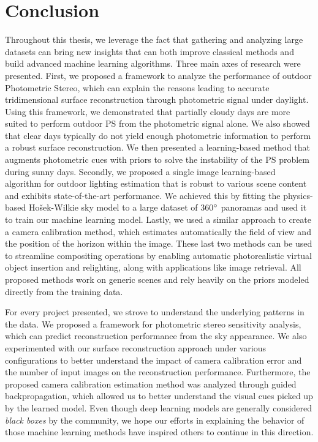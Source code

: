 \chapter*{Conclusion}         %


Throughout this thesis, we leverage the fact that gathering and analyzing large datasets can bring new insights that can both improve classical methods and build advanced machine learning algorithms. Three main axes of research were presented. First, we proposed a framework to analyze the performance of outdoor Photometric Stereo, which can explain the reasons leading to accurate tridimensional surface reconstruction through photometric signal under daylight. Using this framework, we demonstrated that partially cloudy days are more suited to perform outdoor PS from the photometric signal alone. We also showed that clear days typically do not yield enough photometric information to perform a robust surface reconstruction. We then presented a learning-based method that augments photometric cues with priors to solve the instability of the PS problem during sunny days. Secondly, we proposed a single image learning-based algorithm for outdoor lighting estimation that is robust to various scene content and exhibits state-of-the-art performance. We achieved this by fitting the physics-based Ho\v{s}ek-Wilkie sky model to a large dataset of 360$^{\circ}$ panoramas and used it to train our machine learning model. Lastly, we used a similar approach to create a camera calibration method, which estimates automatically the field of view and the position of the horizon within the image. These last two methods can be used to streamline compositing operations by enabling automatic photorealistic virtual object insertion and relighting, along with applications like image retrieval. All proposed methods work on generic scenes and rely heavily on the priors modeled directly from the training data. 

For every project presented, we strove to understand the underlying patterns in the data. We proposed a framework for photometric stereo sensitivity analysis, which can predict reconstruction performance from the sky appearance. We also experimented with our surface reconstruction approach under various configurations to better understand the impact of camera calibration error and the number of input images on the reconstruction performance. Furthermore, the proposed camera calibration estimation method was analyzed through guided backpropagation, which allowed us to better understand the visual cues picked up by the learned model. Even though deep learning models are generally considered \emph{black boxes} by the community, we hope our efforts in explaining the behavior of those machine learning methods have inspired others to continue in this direction.

